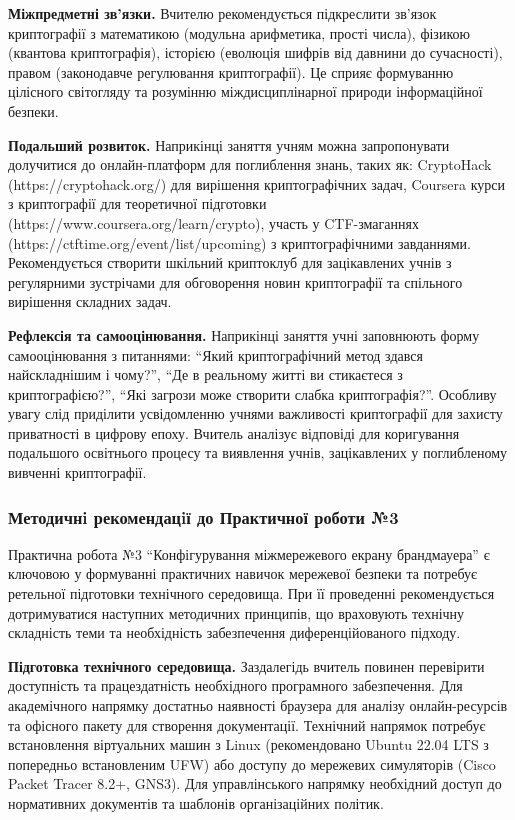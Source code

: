 \textbf{Міжпредметні зв'язки. }Вчителю рекомендується підкреслити зв'язок криптографії з математикою (модульна арифметика, прості числа), фізикою (квантова криптографія), історією (еволюція шифрів від давнини до сучасності), правом (законодавче регулювання криптографії). Це сприяє формуванню цілісного світогляду та розумінню міждисциплінарної природи інформаційної безпеки.

\textbf{Подальший розвиток.} Наприкінці заняття учням можна запропонувати долучитися до онлайн-платформ для поглиблення знань, таких як: CryptoHack (https://cryptohack.org/) для вирішення криптографічних задач, Coursera курси з криптографії для теоретичної підготовки (https://www.coursera.org/learn/crypto), участь у CTF-змаганнях (https://ctftime.org/event/list/upcoming) з криптографічними завданнями. Рекомендується створити шкільний криптоклуб для зацікавлених учнів з регулярними зустрічами для обговорення новин криптографії та спільного вирішення складних задач. 

\textbf{Рефлексія та самооцінювання.} Наприкінці заняття учні заповнюють форму самооцінювання з питаннями: ``Який криптографічний метод здався найскладнішим і чому?'', ``Де в реальному житті ви стикаєтеся з криптографією?'', ``Які загрози може створити слабка криптографія?''. Особливу увагу слід приділити усвідомленню учнями важливості криптографії для захисту приватності в цифрову епоху. Вчитель аналізує відповіді для коригування подальшого освітнього процесу та виявлення учнів, зацікавлених у поглибленому вивченні криптографії.


\subsubsection{Методичнi рекомендацiї до Практичної роботи №3}

Практична робота №3 ``Конфігурування міжмережевого екрану брандмауера'' є ключовою у формуванні практичних навичок мережевої безпеки та потребує ретельної підготовки технічного середовища. При її проведенні рекомендується дотримуватися наступних методичних принципів, що враховують технічну складність теми та необхідність забезпечення диференційованого підходу.

\textbf{Підготовка технічного середовища. }Заздалегідь вчитель повинен перевірити доступність та працездатність необхідного програмного забезпечення. Для академічного напрямку достатньо наявності браузера для аналізу онлайн-ресурсів та офісного пакету для створення документації. Технічний напрямок потребує встановлення віртуальних машин з Linux (рекомендовано Ubuntu 22.04 LTS з попередньо встановленим UFW) або доступу до мережевих симуляторів (Cisco Packet Tracer 8.2+, GNS3). Для управлінського напрямку необхідний доступ до нормативних документів та шаблонів організаційних політик. 

